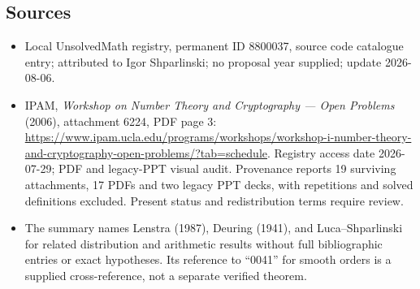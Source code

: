 \documentclass[11pt]{article}
\begin{document}
\subsection{Sources}
\begin{itemize}
\item Local UnsolvedMath registry, permanent ID 8800037, source code catalogue entry; attributed to Igor Shparlinski; no proposal year supplied; update 2026-08-06.
\item IPAM, \emph{Workshop on Number Theory and Cryptography --- Open Problems} (2006), attachment 6224, PDF page 3: \url{https://www.ipam.ucla.edu/programs/workshops/workshop-i-number-theory-and-cryptography-open-problems/?tab=schedule}. Registry access date 2026-07-29; PDF and legacy-PPT visual audit. Provenance reports 19 surviving attachments, 17 PDFs and two legacy PPT decks, with repetitions and solved definitions excluded. Present status and redistribution terms require review.
\item The summary names Lenstra (1987), Deuring (1941), and Luca--Shparlinski for related distribution and arithmetic results without full bibliographic entries or exact hypotheses. Its reference to ``0041'' for smooth orders is a supplied cross-reference, not a separate verified theorem.
\end{itemize}
\end{document}
